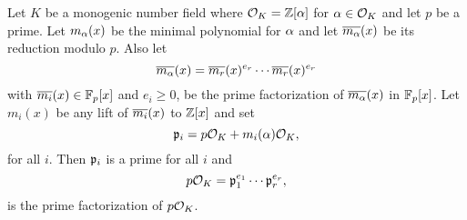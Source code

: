     \begin{theorem*}
      Let $K$ be a monogenic number field where $\mathcal{O}_{K} = \mathbb{Z}[\alpha]$ for $\alpha \in \mathcal{O}_{K}$ and let $p$ be a prime. Let $m_{\alpha}(x)$ be the minimal polynomial for $\alpha$ and let $\overline{m_{\alpha}}(x)$ be its reduction modulo $p$. Also let
      \[
        \overline{m_{\alpha}}(x) = \overline{m_{r}}(x)^{e_{r}} \cdots \overline{m_{r}}(x)^{e_{r}}
      \]
      with $\overline{m_{i}}(x) \in \mathbb{F}_{p}[x]$ and $e_{i} \ge 0$, be the prime factorization of $\overline{m_{\alpha}}(x)$ in $\mathbb{F}_{p}[x]$. Let $m_{i}(x)$ be any lift of $\overline{m_{i}}(x)$ to $\mathbb{Z}[x]$ and set
      \[
        \mathfrak{p}_{i} = p\mathcal{O}_{K}+m_{i}(\alpha)\mathcal{O}_{K},
      \]
      for all $i$. Then $\mathfrak{p}_{i}$ is a prime for all $i$ and
      \[
        p\mathcal{O}_{K} = \mathfrak{p}_{1}^{e_{1}} \cdots \mathfrak{p}_{r}^{e_{r}},
      \]
      is the prime factorization of $p\mathcal{O}_{K}$.
    \end{theorem*}
